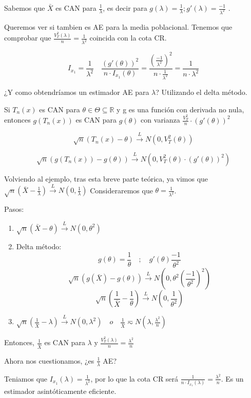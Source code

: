 Sabemos que $\bar{X}$ es CAN para $\frac{1}{\lambda}$, es decir para
$g(\lambda)=\frac{1}{\lambda} ;  g'(\lambda)=\frac{-1}{\lambda^2}$
.

Queremos ver si tambien es AE para la media poblacional. Tenemos que comprobar que $\frac{V_T^2(\lambda)}{n}=\frac{1}{\lambda^2}$
coincida con la cota CR.

\[
I_{x_1}=\frac{1}{\lambda^2} \quad \frac{(g'(\theta))^2}{n \cdot I_{x_1}(\theta)}=
\frac{(\frac{-1}{\lambda^2})^2}{n \cdot \frac{1}{\lambda^2}}=\frac{1}{n \cdot \lambda^2}
\]

¿Y como obtendríamos un estimador AE para $\lambda$?
Utilizando el delta método.

Si $T_n(x)$ es CAN para $\theta \in \Theta \subseteq \mathbb{R}$ y g es una función con derivada no nula,
entonces $g(T_n(x))$ es CAN para $g(\theta)$ con varianza $\frac{V_T^2}{n}\cdot (g'(\theta))^2$

$$\sqrt{n}(T_n(x)-\theta) \xrightarrow{L}N(0,V_T^2(\theta))$$

$$\sqrt{n}(g(T_n(x))-g(\theta)) \xrightarrow{L} N(0,V_T^2(\theta)\cdot(g'(\theta))^2)$$

Volviendo al ejemplo, tras esta breve parte teórica, ya vimos que $\sqrt{n}(\bar{X}-\frac{1}{\lambda})\xrightarrow{L} N(0,\frac{1}{\lambda})$
Consideraremos que $\theta=\frac{1}{\lambda^2}$.

Pasos:
\begin{enumerate}
    \item $\sqrt{n}(\bar{X}-\theta)\xrightarrow{L}N(0,\theta^2)$
    \item Delta método:
          \[
          g(\theta)=\frac{1}{\theta} \quad;\quad g'(\theta)\frac{-1}{\theta^2}
          \]
          \[ 
          \sqrt{n}(g(\bar{X})-g(\theta)) \xrightarrow{L} N(0,\theta^2(\frac{-1}{\theta^2})^2)
          \]
          \[
          \sqrt{n}(\frac{1}{\bar{X}}-\frac{1}{\theta}) \xrightarrow{L} N(0,\frac{1}{\theta^2})
          \]
    \item $ \sqrt{n}(\frac{1}{\bar{X}}-\lambda) \xrightarrow{L} N(0,\lambda^2) \quad o \quad
              \frac{1}{\bar{X}}\eqsim N(\lambda,\frac{\lambda^2}{n})$
\end{enumerate}

Entonces, $\frac{1}{\bar{X}}$ es CAN para $\lambda$ y $\frac{V_T^2(\lambda)}{n}=\frac{\lambda^2}{n}$

Ahora nos cuestionamos, ¿es $\frac{1}{\lambda}$ AE?

Teniamos que $I_{x_1}(\lambda)=\frac{1}{\lambda^2}$, por lo que la cota CR será $\frac{1}{n \cdot I_{x_1}(\lambda)}=\frac{\lambda^2}{n}$.
Es un estimador asintóticamente eficiente.

